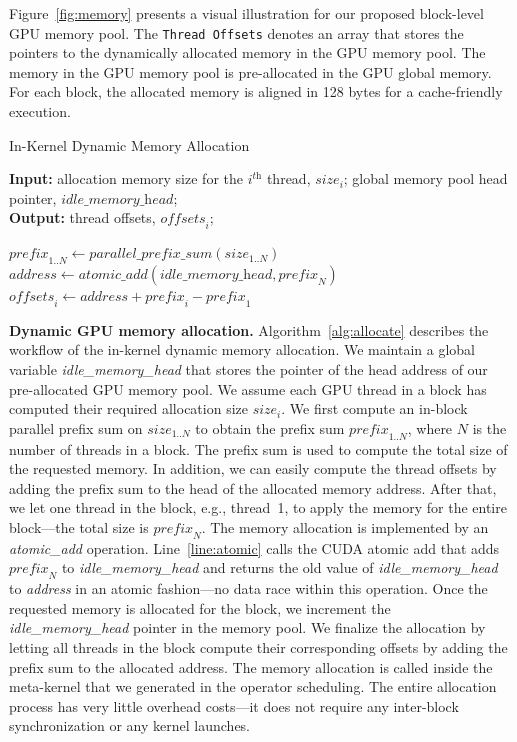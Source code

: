 \documentclass[sigconf]{acmart}
\begin{document}
Figure~\ref{fig:memory} presents a visual illustration for our proposed block-level GPU memory pool. 
The \texttt{Thread Offsets} denotes an array that stores the pointers to the dynamically allocated memory in the GPU memory pool. The memory in the GPU memory pool is pre-allocated in the GPU global memory. For each block, the allocated memory is aligned in 128 bytes for a cache-friendly execution.

\begin{algorithm}
\caption{In-Kernel Dynamic Memory Allocation}\label{alg:allocate}
\textbf{Input:} allocation memory size for the $i^\textit{th}$ thread, $\textit{size}_i$; global memory pool head pointer, $\textit{idle\_memory\_head}$;\\
\textbf{Output:} thread offsets, $\textit{offsets}_i$;
\begin{algorithmic}[1]
\STATE $\textit{prefix}_{1..N} \leftarrow \textit{parallel\_prefix\_sum}(\textit{size}_{1..N})$
\STATE $\textit{address} \leftarrow \textit{atomic\_add}(\textit{idle\_memory\_head},\textit{prefix}_N)$\label{line:atomic}
    \STATE $\textit{offsets}_i \leftarrow \textit{address} + \textit{prefix}_i- \textit{prefix}_1$
\ENDFOR
\end{algorithmic}
\end{algorithm}

\textbf{Dynamic GPU memory allocation.} Algorithm~\ref{alg:allocate} describes the workflow of the in-kernel dynamic memory allocation. We maintain a global variable \textit{idle\_memory\_head} that stores the pointer of the head address of our pre-allocated GPU memory pool. We assume each GPU thread in a block has computed their required allocation size $\textit{size}_i$. We first compute an in-block parallel prefix sum on $\textit{size}_{1..N}$ to obtain the prefix sum $\textit{prefix}_{1..N}$, where $N$ is the number of threads in a block. 
The prefix sum is used to compute the total size of the requested memory. In addition, we can easily compute the thread offsets by adding the prefix sum to the head of the allocated memory address. 
After that, we let one thread in the block, e.g., thread~1, to apply the memory for the entire block---the total size is $\textit{prefix}_N$. 
The memory allocation is implemented by an \textit{atomic\_add} operation. Line~\ref{line:atomic} calls the CUDA atomic add that adds $\textit{prefix}_N$ to \textit{idle\_memory\_head} and returns the old value of \textit{idle\_memory\_head} to \textit{address} in an atomic fashion---no data race within this operation. 
Once the requested memory is allocated for the block, we increment the \textit{idle\_memory\_head} pointer in the memory pool. 
We finalize the allocation by letting all threads in the block compute their corresponding offsets by adding the prefix sum to the allocated address. 
The memory allocation is called inside the meta-kernel that we generated in the operator scheduling. 
The entire allocation process has very little overhead costs---it does not require any inter-block synchronization or any kernel launches. 
\end{document}
